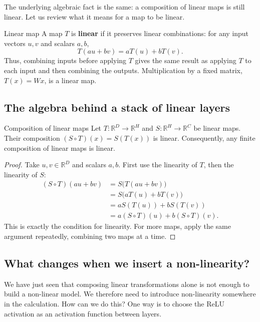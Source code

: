 \documentclass[a4paper,12pt,oneside]{report}
\begin{document}
The underlying algebraic fact is the same: a composition of linear
maps is still linear. Let us review what it means for a map to be linear.

\begin{frameddefn}{Linear map}\label{def:linear-map}
A map $T$ is \textbf{linear} if it preserves linear combinations:
for any input vectors $u,v$ and scalars $a,b$,
\[
  T(au+bv)=aT(u)+bT(v).
\]
Thus, combining inputs before applying $T$ gives the same result as
applying $T$ to each input and then combining the outputs.
Multiplication by a fixed matrix, $T(x)=Wx$, is a linear map.
\end{frameddefn}

\clearpage
\subsection{The algebra behind a stack of linear layers}

\begin{framedprop}{Composition of linear maps}\label{prop:composition-linear-maps}
Let $T:\mathbb{R}^{D}\to\mathbb{R}^{H}$ and
$S:\mathbb{R}^{H}\to\mathbb{R}^{C}$ be linear maps.
Their composition $(S\circ T)(x)=S(T(x))$ is linear.
Consequently, any finite composition of linear maps is linear.
\end{framedprop}

\begin{proof}
Take $u,v\in\mathbb{R}^{D}$ and scalars $a,b$. First use the
linearity of $T$, then the linearity of $S$:
\[
\begin{aligned}
 (S\circ T)(au+bv)
   &=S\bigl(T(au+bv)\bigr)\\
   &=S\bigl(aT(u)+bT(v)\bigr)\\
   &=aS(T(u))+bS(T(v))\\
   &=a(S\circ T)(u)+b(S\circ T)(v).
\end{aligned}
\]
This is exactly the condition for linearity. For more maps, apply
the same argument repeatedly, combining two maps at a time.
\end{proof}



\clearpage
\subsection{What changes when we insert a non-linearity?}

We have just seen that composing linear transformations alone is
not enough to build a non-linear model. We therefore need to introduce
non-linearity somewhere in the calculation. How can we do this?
One way is to choose the ReLU activation as an activation function
between layers.
\end{document}
